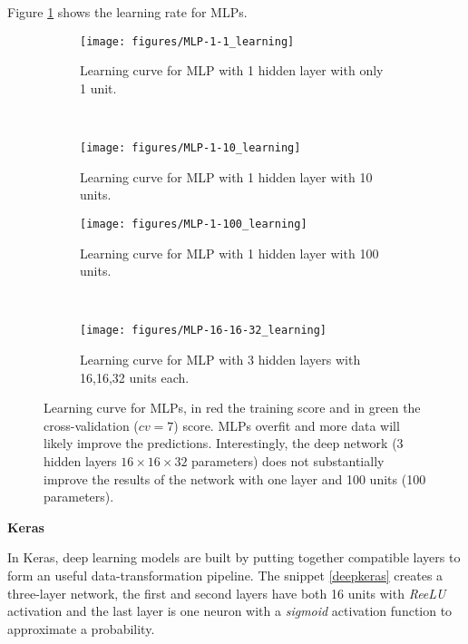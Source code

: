 \documentclass[11pt]{article}
\theoremstyle{definition}
\theoremstyle{remark}
\begin{document}
Figure \ref{fig:mlp_learning} shows the learning rate for MLPs.
\begin{figure}[H]
    \centering
    \begin{subfigure}[t]{0.45\textwidth}
        \centering
        \texttt{[image: figures/MLP-1-1\_learning]}
        \caption{Learning curve for MLP with 1 hidden layer with only 1 unit.}
    \end{subfigure}
 	~   
    \begin{subfigure}[t]{0.45\textwidth}
        \centering
        \texttt{[image: figures/MLP-1-10\_learning]}
        \caption{Learning curve for MLP with 1 hidden layer with 10 units.}
    \end{subfigure}%
    
    \begin{subfigure}[t]{0.45\textwidth}
        \centering
        \texttt{[image: figures/MLP-1-100\_learning]}
        \caption{Learning curve for MLP with 1 hidden layer with 100 units.}
    \end{subfigure}%
    ~
    \begin{subfigure}[t]{0.45\textwidth}
        \centering
        \texttt{[image: figures/MLP-16-16-32\_learning]}
        \caption{Learning curve for MLP with 3 hidden layers with 16,16,32 units each.}
    \end{subfigure}%
    \caption{Learning curve for  MLPs, in red the training score and in green the cross-validation ($cv=7$) score. MLPs overfit and more data will likely improve the predictions. Interestingly, the deep network (3 hidden layers $16 \times 16 \times 32$ parameters) does not substantially improve the results of the network with one layer and 100 units (100 parameters).} \label{fig:mlp_learning}
\end{figure}




\textbf{Keras}

In Keras, deep learning models are built by putting together compatible layers to form an useful data-transformation pipeline. The snippet \ref{deepkeras} creates a three-layer network, the first and second layers have both 16 units with \emph{ReeLU} activation and the last layer is one neuron with a \emph{sigmoid} activation function to approximate a probability.
\end{document}
